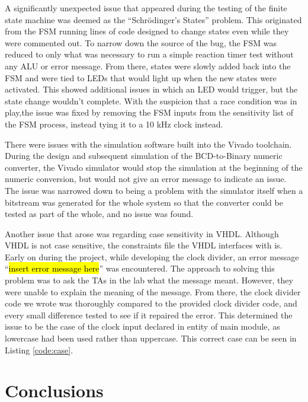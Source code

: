 \documentclass[11pt]{article}
\begin{document}
A significantly unexpected issue that appeared during the testing of the finite state machine was deemed as the ``Schrödinger's States'' problem. This originated from the FSM running lines of code designed to change states even while they were commented out. To narrow down the source of the bug, the FSM was reduced to only what was necessary to run a simple reaction timer test without any ALU or error message. From there, states were slowly added back into the FSM and were tied to LEDs that would light up when the new states were activated. This showed additional issues in which an LED would trigger, but the state change wouldn't complete. With the suspicion that a race condition was in play,the issue was fixed by removing the FSM inputs from the sensitivity list of the FSM process, instead tying it to a 10 kHz clock instead.

There were issues with the simulation software built into the Vivado toolchain. During the design and subsequent simulation of the BCD-to-Binary numeric converter, the Vivado simulator would stop the simulation at the beginning of the numeric conversion, but would not give an error message to indicate an issue. The issue was narrowed down to being a problem with the simulator itself when a bitstream was generated for the whole system so that the converter could be tested as part of the whole, and no issue was found.

Another issue that arose was regarding case sensitivity in VHDL. Although VHDL is not case sensitive, the constraints file the VHDL interfaces with is. Early on during the project, while developing the clock divider, an error message ``\hl{insert error message here}'' was encountered. The approach to solving this problem was to ask the TAs in the lab what the message meant. However, they were unable to explain the meaning of the message. From there, the clock divider code we wrote was thoroughly compared to the provided clock divider code, and every small difference tested to see if it repaired the error. This determined the issue to be the case of the clock input declared in entity of main module, as lowercase had been used rather than uppercase. This correct case can be seen in Listing \ref{code:case}.

\section{Conclusions}
\end{document}
